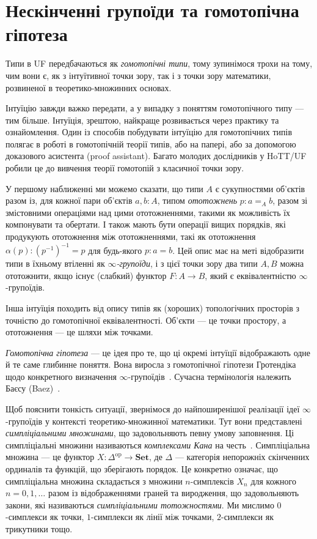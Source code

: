 \documentclass[12pt]{article}
\newcommand*{\Set}{\ensuremath{\mathbf{Set}}}
\newcommand*{\op}{^{\mathrm{op}}}
\begin{document}
\section{Нескінченні групоїди та гомотопічна гіпотеза}
\label{sec:inftygroupoids}

Типи в UF передбачаються як \emph{гомотопічні типи}, тому зупинімося трохи на тому, чим вони є, як з інтуїтивної точки зору, так і з точки зору математики, розвиненої в теоретико-множинних основах.

Інтуїцію завжди важко передати, а у випадку з поняттям гомотопічного типу — тим більше. Інтуїція, зрештою, найкраще розвивається через практику та ознайомлення. Один із способів побудувати інтуїцію для гомотопічних типів полягає в роботі в гомотопічній теорії типів, або на папері, або за допомогою доказового асистента (proof assistant). Багато молодих дослідників у HoTT/UF робили це до вивчення теорії гомотопій з класичної точки зору.

У першому наближенні ми можемо сказати, що типи $A$ є сукупностями об'єктів разом із, для кожної пари об'єктів $a,b:A$, типом \emph{ототожнень} $p : a=_A b$, разом зі змістовними операціями над цими ототожненнями, такими як можливість їх компонувати та обертати. І також мають бути операції вищих порядків, які продукують ототожнення між ототожненнями, такі як ототожнення $\alpha(p) : (p^{-1})^{-1} = p$ для будь-якого $p : a = b$. Цей опис має на меті відобразити типи в їхньому втіленні як \emph{$\infty$-групоїди}, і з цієї точки зору два типи $A,B$ можна ототожнити, якщо існує (слабкий) функтор $F:A \to B$, який є еквівалентністю $\infty$-групоїдів.

Інша інтуїція походить від опису типів як (хороших) топологічних просторів з точністю до гомотопічної еквівалентності. Об'єкти — це точки простору, а ототожнення — це шляхи між точками. 

\emph{Гомотопічна гіпотеза} — це ідея про те, що ці окремі інтуїції відображають одне й те саме глибинне поняття. Вона виросла з гомотопічної гіпотези Гротендіка щодо конкретного визначення $\infty$-групоїдів~\cite{Grothendieck1983}. Сучасна термінологія належить Баєсу (Baez)~\cite{Baez2007}.

Щоб пояснити тонкість ситуації, звернімося до найпоширенішої реалізації ідеї $\infty$-групоїдів у контексті теоретико-множинної математики. Тут вони представлені \emph{симпліціальними множинами}, що задовольняють певну умову заповнення. Ці симпліціальні множини називаються \emph{комплексами Кана} на честь~\cite{KanIII}. Симпліціальна множина — це функтор $X : \Delta\op \to \Set$, де $\Delta$ — категорія непорожніх скінченних ординалів та функцій, що зберігають порядок. Це конкретно означає, що симпліціальна множина складається з множини $n$-симплексів $X_n$ для кожного $n=0,1,\dots$ разом із відображеннями граней та виродження, що задовольняють закони, які називаються \emph{симпліціальними тотожностями}. Ми мислимо $0$-симплекси як точки, $1$-симплекси як лінії між точками, $2$-симплекси як трикутники тощо.
\end{document}
